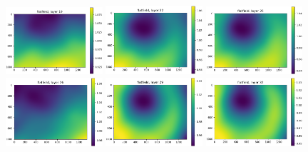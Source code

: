 \documentclass[letterpaper,11pt]{article}
\begin{document}
\begin{figure}[!ht]
\includegraphics[width=0.32\textwidth]{images/results/flatfield_layers_vectra/flatfield_layer_19}
\includegraphics[width=0.32\textwidth]{images/results/flatfield_layers_vectra/flatfield_layer_22}
\includegraphics[width=0.32\textwidth]{images/results/flatfield_layers_vectra/flatfield_layer_25}
\includegraphics[width=0.32\textwidth]{images/results/flatfield_layers_vectra/flatfield_layer_26}
\includegraphics[width=0.32\textwidth]{images/results/flatfield_layers_vectra/flatfield_layer_29}
\includegraphics[width=0.32\textwidth]{images/results/flatfield_layers_vectra/flatfield_layer_32}

\end{figure}
\end{document}

